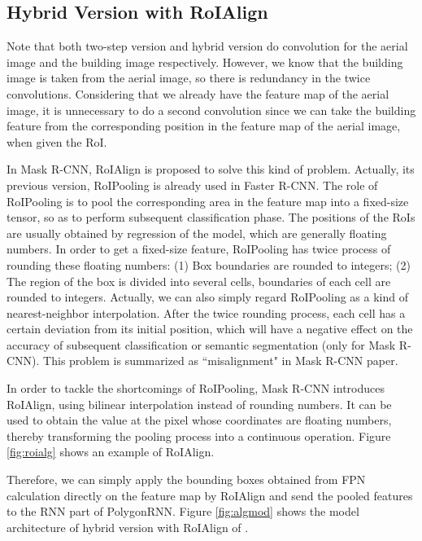 \subsection{Hybrid Version with RoIAlign}\label{algmod}
Note that both two-step version and hybrid version do convolution for the aerial image and the building image respectively. However, we know that the building image is taken from the aerial image, so there is redundancy in the twice convolutions. Considering that we already have the feature map of the aerial image, it is unnecessary to do a second convolution since we can take the building feature from the corresponding position in the feature map of the aerial image, when given the RoI.

In Mask R-CNN, RoIAlign \cite{maskrcnn} is proposed to solve this kind of problem. Actually, its previous version, RoIPooling \cite{fasterrcnn} is already used in Faster R-CNN. The role of RoIPooling is to pool the corresponding area in the feature map into a fixed-size tensor, so as to perform subsequent classification phase. The positions of the RoIs are usually obtained by regression of the model, which are generally floating numbers. In order to get a fixed-size feature, RoIPooling has twice process of rounding these floating numbers: (1) Box boundaries are rounded to integers; (2) The region of the box is divided into several cells, boundaries of each cell are rounded to integers. Actually, we can also simply regard RoIPooling as a kind of nearest-neighbor interpolation. After the twice rounding process, each cell has a certain deviation from its initial position, which will have a negative effect on the accuracy of subsequent classification or semantic segmentation (only for Mask R-CNN). This problem is summarized as ``misalignment" in Mask R-CNN paper.



In order to tackle the shortcomings of RoIPooling, Mask R-CNN introduces RoIAlign, using bilinear interpolation instead of rounding numbers. It can be used to obtain the value at the pixel whose coordinates are floating numbers, thereby transforming the pooling process into a continuous operation. Figure \ref{fig:roialg} shows an example of RoIAlign.


Therefore, we can simply apply the bounding boxes obtained from FPN calculation directly on the feature map by RoIAlign and send the pooled features to the RNN part of PolygonRNN. Figure \ref{fig:algmod} shows the model architecture of hybrid version with RoIAlign of \modelnameshort.

